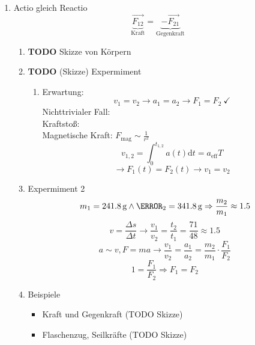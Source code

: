 \documentclass[11pt]{article}
\renewcommand{\d}{\mathrm{d}}
\newcommand{\f}[2]{{\frac{#1}{#2}}}
\renewcommand{\v}[1]{\vec{#1}}
\begin{document}
\begin{enumerate}
\item Actio gleich Reactio
\label{sec-7-2-1-6}
\[\underbrace{\v{F_{12}}}_{\text{Kraft}} = \underbrace{-\v{F_{21}}}_{\text{Gegenkraft}}\]
\begin{enumerate}
\item {\bfseries\sffamily TODO} Skizze von Körpern
\label{sec-7-2-1-6-1}
\item {\bfseries\sffamily TODO} (Skizze) Expermiment
\label{sec-7-2-1-6-2}
\begin{enumerate}
\item Erwartung:
\label{sec-7-2-1-6-2-1}
\[v_1 = v_2 \rightarrow a_1 = a_2 \rightarrow F_1 = F_2~\checkmark\]
Nichttrivialer Fall: \\
       Kraftstoß: \\
       Magnetische Kraft: $F_{\text{mag}} \sim {\f{1}{r^2}}$
\[v_{1,2} = \int_0^{t_{1,2}} a(t)\d t = a_{\text{eff}}T\]
\[\rightarrow F_1(t) = F_2(t) \rightarrow v_1 = v_2\]
\end{enumerate}
\item Expermiment 2
\label{sec-7-2-1-6-3}
\[m_1 = \SI{241.8}{\gram} \wedge \m_2 = \SI{341.8}{\gram} \Rightarrow \f{m_2}{m_1} \approx 1.5\]
\[v = \f{\Delta s}{\Delta t} \rightarrow \f{v_1}{v_2} = \f{t_2}{t_1} = \f{71}{48} \approx 1.5\]
\[a\sim v, F = m a \rightarrow \f{v_1}{v_2} = \f{a_1}{a_2} = \f{m_2}{m_1}\cdot \f{F_1}{F_2}\]
\[1 = \f{F_1}{F_2} \Rightarrow F_1 = F_2\]
\item Beispiele
\label{sec-7-2-1-6-4}
\begin{itemize}
\item Kraft und Gegenkraft (TODO Skizze)
\item Flaschenzug, Seilkräfte (TODO Skizze)
\end{itemize}
\end{enumerate}
\end{enumerate}
\end{document}
